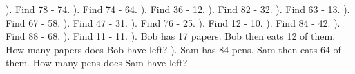 \documentclass{article}%
\begin{document}
\newline%
). Find 78 {-} 74.%
\newline%
\newline%
). Find 74 {-} 64.%
\newline%
\newline%
). Find 36 {-} 12.%
\newline%
\newline%
). Find 82 {-} 32.%
\newline%
\newline%
). Find 63 {-} 13.%
\newline%
\newline%
). Find 67 {-} 58.%
\newline%
\newline%
). Find 47 {-} 31.%
\newline%
\newline%
). Find 76 {-} 25.%
\newline%
\newline%
). Find 12 {-} 10.%
\newline%
\newline%
). Find 84 {-} 42.%
\newline%
\newline%
). Find 88 {-} 68.%
\newline%
\newline%
). Find 11 {-} 11.%
\newline%
\newline%
). Bob has 17 papers. Bob then eats 12 of them. How many papers does Bob have left?%
\newline%
\newline%
). Sam has 84 pens. Sam then eats 64 of them. How many pens does Sam have left?%
\newline%
\newline%
\newline%
\end{document}
